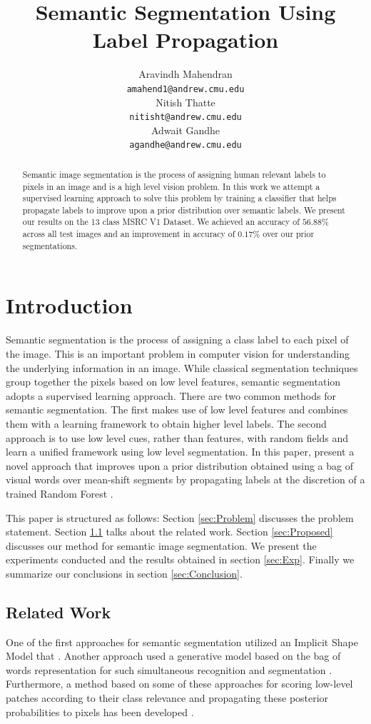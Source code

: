 \documentclass{article} %
\title{Semantic Segmentation Using Label Propagation}
\author{
Aravindh Mahendran \\
\texttt{amahend1@andrew.cmu.edu} \\ 
\And
Nitish Thatte \\
\texttt{nitisht@andrew.cmu.edu} \\
\AND
Adwait Gandhe \\
\texttt{agandhe@andrew.cmu.edu} \\
}
\begin{document}
\maketitle

\begin{abstract}
Semantic image segmentation is the process of assigning human relevant labels to pixels in an image and is a high level vision problem. In this work we attempt a supervised learning approach to solve this problem by training a classifier that helps propagate labels to improve upon a prior distribution over semantic labels. We present our results on the 13 class MSRC V1 Dataset. We achieved an accuracy of $56.88\%$ across all test images and an improvement in accuracy of $0.17\%$ over our prior segmentations.
\end{abstract}


\section{Introduction}
Semantic segmentation is the process of assigning a class label to each pixel of the image. This is an important problem in computer vision for understanding the underlying information in an image. While classical segmentation techniques group together the pixels based on low level features, semantic segmentation adopts a supervised learning approach. There are two common methods for semantic segmentation. The first makes use of low level features and combines them with a learning framework to obtain higher level labels. The second approach is to use low level cues, rather than features, with random fields and learn a unified framework using low level segmentation. In this paper, present a novel approach that improves upon a prior distribution obtained using a bag of visual words over mean-shift segments by propagating labels at the discretion of a trained Random Forest \cite{Statistics01randomforests}.

This paper is structured as follows: Section \ref{sec:Problem} discusses the problem statement. Section \ref{sec:Related} talks about the related work. Section \ref{sec:Proposed} discusses our method for semantic image segmentation. We present the experiments conducted and the results obtained in section \ref{sec:Exp}. Finally we summarize our conclusions in section \ref{sec:Conclusion}.
\label{sec:Intro}

\subsection{Related Work}
\label{sec:Related}
One of the first approaches for semantic segmentation utilized an Implicit Shape Model that %
\cite{Leibe04combinedobject}. 
Another approach used a generative model based on the bag of words representation for such simultaneous recognition and segmentation \cite{cao:spatially}.  
Furthermore, a method based on some of these approaches for scoring low-level patches according to their class relevance and propagating these posterior probabilities to pixels has been developed \cite{conf/bmvc/CsurkaP08}.
\end{document}
